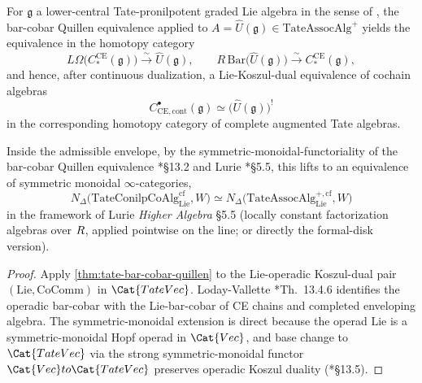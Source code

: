 \begin{cor}
  \label{cor:tate-lie-bar-cobar}
  For $\mathfrak g$ a lower-central Tate-pronilpotent graded Lie algebra in the
  sense of \alpharef, the bar-cobar Quillen equivalence applied
  to $A=\widehat U(\mathfrak g)\in\mathrm{TateAssocAlg}^+$ yields
  the equivalence in the homotopy category
  $$L\Omega\bigl(C_*^{\mathrm{CE}}(\mathfrak g)\bigr)
    \xrightarrow{\sim}\widehat U(\mathfrak g),\qquad
    R\,\mathrm{Bar}\bigl(\widehat U(\mathfrak g)\bigr)
    \xrightarrow{\sim}C_*^{\mathrm{CE}}(\mathfrak g),$$
  and hence, after continuous dualization, a Lie-Koszul-dual equivalence
  of cochain algebras
  $$C^\bullet_{\mathrm{CE},\mathrm{cont}}(\mathfrak g)
    \simeq\bigl(\widehat U(\mathfrak g)\bigr)^!$$
  in the corresponding homotopy category of complete augmented
  Tate algebras.

  Inside the admissible envelope, by the symmetric-monoidal-functoriality of the bar-cobar
  Quillen equivalence \cite{loday-vallette}*{\S 13.2} and Lurie
  \cite{lurie-ha}*{\S 5.5}, this lifts to an equivalence of
  symmetric monoidal $\infty$-categories,
  $$N_\Delta\bigl(\mathrm{TateConilpCoAlg}_{\mathrm{Lie}}^{\mathrm{cf}},
    W\bigr)\simeq
    N_\Delta\bigl(\mathrm{TateAssocAlg}_{\mathrm{Lie}}^{+,\mathrm{cf}},
    W\bigr)$$
  in the framework of Lurie \emph{Higher Algebra} \S 5.5
  (locally constant factorization algebras over $R$, applied
  pointwise on the line; or directly the formal-disk version).
\end{cor}

\begin{proof}
  Apply \ref{thm:tate-bar-cobar-quillen} to the
  Lie-operadic Koszul-dual pair $(\mathrm{Lie},\mathrm{CoComm})$
  in $\Cat{TateVec}$. Loday-Vallette \cite{loday-vallette}*{Th.~13.4.6}
  identifies the operadic bar-cobar with the Lie-bar-cobar of
  CE chains and completed enveloping algebra. The
  symmetric-monoidal extension is direct because the operad
  $\mathrm{Lie}$ is a symmetric-monoidal Hopf operad in
  $\Cat{Vec}$, and base change to $\Cat{TateVec}$ via the strong
  symmetric-monoidal functor $\Cat{Vec}\to\Cat{TateVec}$
  preserves operadic Koszul duality
  (\cite{loday-vallette}*{\S 13.5}).
\end{proof}

